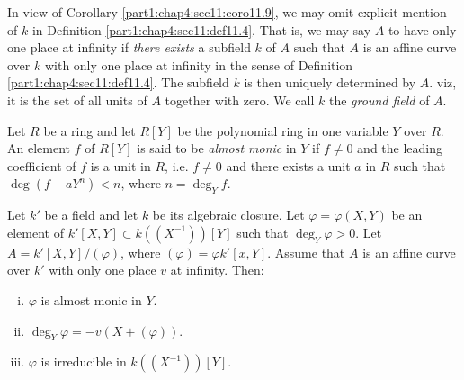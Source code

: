 \begin{remark}\label{part1:chap4:sec11:rem11.10}
  In view of Corollary \ref{part1:chap4:sec11:coro11.9}, we may omit
  explicit mention of $k$ in Definition
  \ref{part1:chap4:sec11:def11.4}. That is, we may say $A$ to have
  only one place at infinity if {\em there exists} a subfield $k$ of
  $A$ such that $A$ is an affine curve over $k$ with only one place at
  infinity in the sense of Definition
  \ref{part1:chap4:sec11:def11.4}. The subfield $k$ is then uniquely
  determined by $A$. viz, it is the set of all units of $A$ together
  with \pageoriginale zero. We call $k$ the {\em ground field} of $A$.
\end{remark}

\begin{defi}\label{part1:chap4:sec11:def11.11}
  Let $R$ be a ring and let $R[Y]$ be the polynomial ring in one
  variable $Y$ over $R$. An element $f$ of $R [Y]$ is said to be {\em
    almost monic} in $Y$ if $f \neq 0$ and the leading coefficient of
  $f$ is a unit in $R$, i.e. $f\neq 0$ and there exists a unit $a$ in
  $R$ such that $\deg (f-aY^n)< n$, where $n =\deg_Y f$. 
\end{defi}

\begin{prop}\label{part1:chap4:sec11:prop11.12}
  Let $k'$ be a field and let $k$ be its algebraic closure. Let
  $\varphi= \varphi (X, Y)$ be an element of $k' [X, Y] \subset
  k((X^{-1})) [Y]$ such that $\deg_Y \varphi > 0$. Let $A = k' [X,
    Y]/(\varphi)$, where $(\varphi)= \varphi k' [x, Y]$. Assume that
  $A$ is an affine curve over $k'$ with only one place $v$ at
  infinity. Then:
  \begin{enumerate}[(i)]
    \item $\varphi$ is almost monic in $Y$.
      \item $\deg_Y \varphi =- v(X + (\varphi))$.
        \item $\varphi$ is irreducible in $k((X^{-1}))[Y]$.
  \end{enumerate}
\end{prop}

